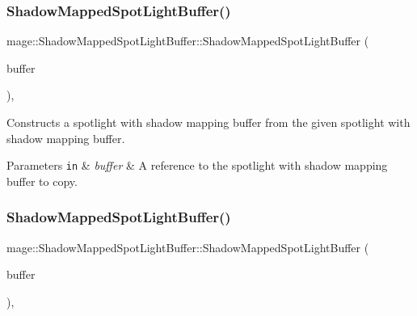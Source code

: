 \subsubsection{\texorpdfstring{Shadow\+Mapped\+Spot\+Light\+Buffer()}{ShadowMappedSpotLightBuffer()}\hspace{0.1cm}{\footnotesize\ttfamily [2/3]}}
{\footnotesize\ttfamily mage\+::\+Shadow\+Mapped\+Spot\+Light\+Buffer\+::\+Shadow\+Mapped\+Spot\+Light\+Buffer (\begin{DoxyParamCaption}\item[{const \hyperlink{structmage_1_1_shadow_mapped_spot_light_buffer}{Shadow\+Mapped\+Spot\+Light\+Buffer} \&}]{buffer }\end{DoxyParamCaption})\hspace{0.3cm}{\ttfamily [default]}, {\ttfamily [noexcept]}}

Constructs a spotlight with shadow mapping buffer from the given spotlight with shadow mapping buffer.


\begin{DoxyParams}[1]{Parameters}
\mbox{\tt in}  & {\em buffer} & A reference to the spotlight with shadow mapping buffer to copy. \\
\hline
\end{DoxyParams}
\hypertarget{structmage_1_1_shadow_mapped_spot_light_buffer_aa4b579dd9b8085fc233f4e71b29757c5}{}\label{structmage_1_1_shadow_mapped_spot_light_buffer_aa4b579dd9b8085fc233f4e71b29757c5} 
\subsubsection{\texorpdfstring{Shadow\+Mapped\+Spot\+Light\+Buffer()}{ShadowMappedSpotLightBuffer()}\hspace{0.1cm}{\footnotesize\ttfamily [3/3]}}
{\footnotesize\ttfamily mage\+::\+Shadow\+Mapped\+Spot\+Light\+Buffer\+::\+Shadow\+Mapped\+Spot\+Light\+Buffer (\begin{DoxyParamCaption}\item[{\hyperlink{structmage_1_1_shadow_mapped_spot_light_buffer}{Shadow\+Mapped\+Spot\+Light\+Buffer} \&\&}]{buffer }\end{DoxyParamCaption})\hspace{0.3cm}{\ttfamily [default]}, {\ttfamily [noexcept]}}

